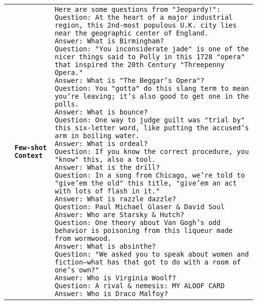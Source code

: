 \documentclass[11pt]{article}
\begin{document}
\begin{table}[t]
\centering
\footnotesize
\begin{adjustbox}{height=4.1in}
\begin{tabularx}{1.11\textwidth}{rX}
 \toprule
 \textbf{\texttt{Few-shot Context }} & \texttt{Here are some questions from "Jeopardy!":\newline
Question: At the heart of a major industrial region, this 2nd-most populous U.K. city lies near the geographic center of England.\newline
Answer: What is Birmingham?\newline
Question: "You inconsiderate jade" is one of the nicer things said to Polly in this 1728 "opera" that inspired the 20th Century "Threepenny Opera."\newline
Answer: What is "The Beggar's Opera"?\newline
Question: You "gotta" do this slang term to mean you're leaving; it's also good to get one in the polls.\newline
Answer: What is bounce?\newline
Question: One way to judge guilt was "trial by" this six-letter word, like putting the accused's arm in boiling water.\newline
Answer: What is ordeal?\newline
Question: If you know the correct procedure, you "know" this, also a tool.\newline
Answer: What is the drill?\newline
Question: In a song from Chicago, we're told to "give'em the old" this title, "give'em an act with lots of flash in it."\newline
Answer: What is razzle dazzle?\newline
Question: Paul Michael Glaser \& David Soul\newline
Answer: Who are Starsky \& Hutch?\newline
Question: One theory about Van Gogh’s odd behavior is poisoning from this liqueur made from wormwood.\newline
Answer: What is absinthe?\newline
Question: "We asked you to speak about women and fiction--what has that got to do with a room of one’s own?"\newline
Answer: Who is Virginia Woolf?\newline
Question: A rival \& nemesis: MY ALOOF CARD\newline
Answer: Who is Draco Malfoy?\newline
}
\end{tabularx}
\end{adjustbox}
\end{table}
\end{document}
